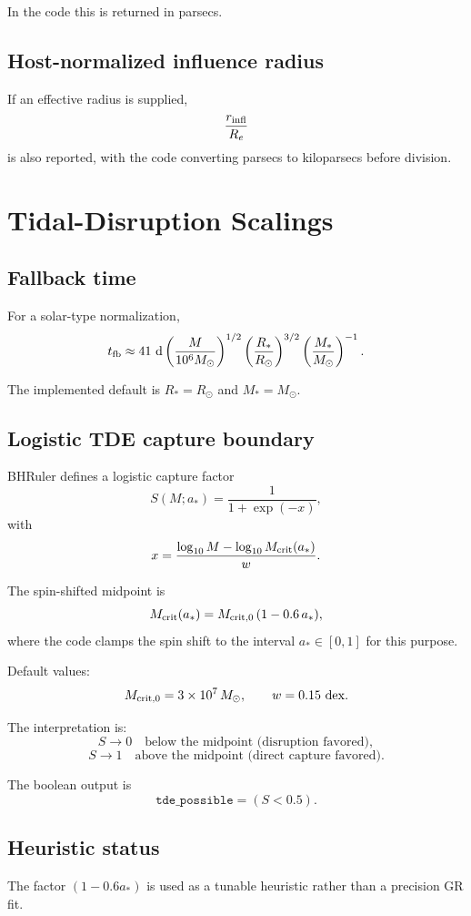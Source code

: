 \documentclass[12pt]{article}
\begin{document}
In the code this is returned in parsecs.

\subsection*{Host-normalized influence radius}
If an effective radius is supplied,
\[
\frac{r_{\rm infl}}{R_e}
\]
is also reported, with the code converting parsecs to kiloparsecs before division.

\section{Tidal-Disruption Scalings}

\subsection*{Fallback time}
For a solar-type normalization,
\[
t_{\rm fb} \approx 41~{\rm d}
\left(\frac{M}{10^6M_\odot}\right)^{1/2}
\left(\frac{R_*}{R_\odot}\right)^{3/2}
\left(\frac{M_*}{M_\odot}\right)^{-1}.
\]

The implemented default is $R_*=R_\odot$ and $M_*=M_\odot$.

\subsection*{Logistic TDE capture boundary}
BHRuler defines a logistic capture factor
\[
S(M;a_*) =
\frac{1}{1+\exp(-x)},
\]
with
\[
x = \frac{\log_{10} M - \log_{10} M_{\rm crit}(a_*)}{w}.
\]

The spin-shifted midpoint is
\[
M_{\rm crit}(a_*) = M_{\rm crit,0}\,(1-0.6\,a_*),
\]
where the code clamps the spin shift to the interval $a_* \in [0,1]$ for this purpose.

Default values:
\[
M_{\rm crit,0} = 3\times10^7\,M_\odot,
\qquad
w = 0.15\ {\rm dex}.
\]

The interpretation is:
\[
S \rightarrow 0 \quad \text{below the midpoint (disruption favored)},
\]
\[
S \rightarrow 1 \quad \text{above the midpoint (direct capture favored)}.
\]

The boolean output is
\[
\texttt{tde\_possible} = (S < 0.5).
\]

\subsection*{Heuristic status}
The factor $(1-0.6a_*)$ is used as a tunable heuristic rather than a precision GR fit.
\end{document}
